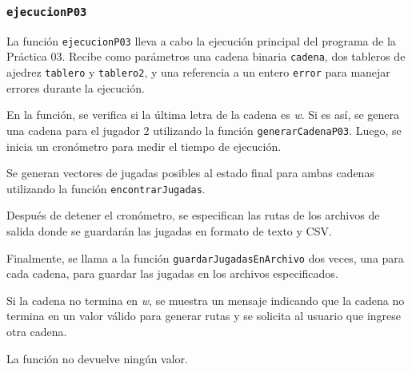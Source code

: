 \documentclass{article}
\begin{document}
        \subsubsection*{\texttt{ejecucionP03}}
        La función \texttt{ejecucionP03} lleva a cabo la ejecución principal del programa de la Práctica 03. Recibe como parámetros
        una cadena binaria \texttt{cadena}, dos tableros de ajedrez \texttt{tablero} y \texttt{tablero2}, y una referencia a un entero
        \texttt{error} para manejar errores durante la ejecución.

        En la función, se verifica si la última letra de la cadena es \textit{w}. Si es así, se genera una cadena para el jugador 2
        utilizando la función \texttt{generarCadenaP03}. Luego, se inicia un cronómetro para medir el tiempo de ejecución.

        Se generan vectores de jugadas posibles al estado final para ambas cadenas utilizando la función \texttt{encontrarJugadas}.

        Después de detener el cronómetro, se especifican las rutas de los archivos de salida donde se guardarán las jugadas en formato
        de texto y CSV.{\@}

        Finalmente, se llama a la función \texttt{guardarJugadasEnArchivo} dos veces, una para cada cadena, para guardar las jugadas
        en los archivos especificados.

        Si la cadena no termina en \textit{w}, se muestra un mensaje indicando que la cadena no termina en un valor válido para
        generar rutas y se solicita al usuario que ingrese otra cadena.

        La función no devuelve ningún valor.
\end{document}
